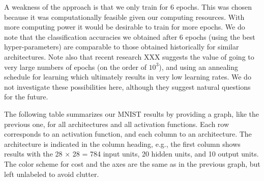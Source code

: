 \documentclass[10pt]{article}
\begin{document}
A weakness of the approach is that we only train for 6 epochs.  This
was chosen because it was computationally feasible given our computing
resources.  With more computing power it would be desirable to train
for more epochs.  We do note that the classification accuracies we
obtained after 6 epochs (using the best hyper-parameters) are
comparable to those obtained historically for similar architectures.
Note also that recent research XXX suggests the value of going to very
large numbers of epochs (on the order of $10^3$), and using an
annealing schedule for learning which ultimately results in very low
learning rates.  We do not investigate these possibilities here,
although they suggest natural questions for the future.

% 

The following table summarizes our MNIST results by providing a graph,
like the previous one, for all architectures and all activation
functions. Each row corresponds to an activation function, and each
column to an architecture.  The architecture is indicated in the
column heading, e.g., the first column shows results with the 28
$\times$ 28 = 784 input units, 20 hidden units, and 10 output units.
The color scheme for cost and the axes are the same as in the previous
graph, but left unlabeled to avoid clutter.
\end{document}
